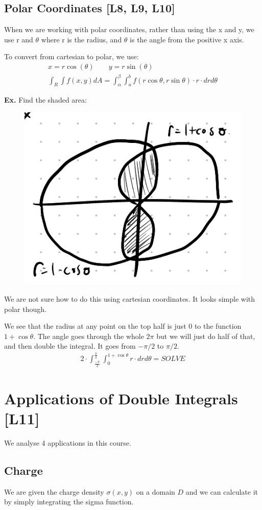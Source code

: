 \documentclass[12pt,letterpaper]{article} \usepackage{amsmath} \usepackage{graphicx} \usepackage[margin=1in]{geometry} \usepackage{longtable}  \usepackage{amssymb}
\begin{document}
	\subsection{Polar Coordinates [L8, L9, L10]}
	When we are working with polar coordinates, rather than using the x and y, we use r and $\theta$ where r is the radius, and $\theta$ is the angle from the positive x axis. 
	
	To convert from cartesian to polar, we use:
	\begin{align*}
		x = r\cos(\theta) \qquad y = r\sin(\theta)\\
		\int_R \int f(x,y) dA = \int^{\beta} _{\alpha} \int^b_a f(r\cos\theta,r\sin\theta)\cdot r\cdot drd\theta
	\end{align*}
	
	\begin{mdframed}[]
		\textbf{Ex. } Find the shaded area:
		\begin{figure}[H]
			\centering
			\includegraphics[width=0.4\linewidth]{figure.png}
		\end{figure}
	
		We are not sure how to do this using cartesian coordinates. It looks simple with polar though.
		
		We see that the radius at any point on the top half is just 0 to the function $1+\cos\theta$. The angle goes through the whole $2\pi$ but we will just do half of that, and then double the integral. It goes from $-\pi/2$ to $\pi/2$.
		\begin{align*}
			2\cdot \int^{\frac{\pi}{2}}_\frac{-\pi}{2} \int_0^{1+\cos\theta} r\cdot drd\theta = SOLVE
		\end{align*}
	\end{mdframed}

	
	\section{Applications of Double Integrals [L11]}
	
	We analyse 4 applications in this course.
	
	\subsection{Charge}
	We are given the charge density $\sigma (x,y)$ on a domain $D$ and we can calculate it by simply integrating the sigma function.
	
\end{document}
